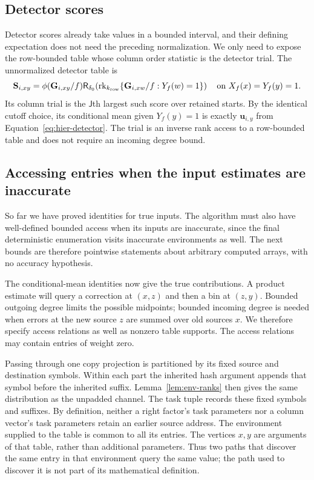 \documentclass[11pt]{article}
\numberwithin{equation}{section}
\theoremstyle{definition}
\theoremstyle{remark}
\begin{document}
\subsection{Detector scores}

Detector scores already take values in a bounded interval, and their defining expectation does not need the preceding normalization. We only need to expose the row-bounded table whose column order statistic is the detector trial. The unnormalized detector table is
\begin{equation}
 {\mathbf{S}}_{i,xy}=\phi({\mathbf{G}}_{i,xy}/f)
 {\mathsf{R}}_{\delta_0}\!\left(\operatorname{rk}_{k_{\rm row}}
       \{{\mathbf{G}}_{i,xw}/f:Y_f(w)=1\}\right)
 \quad\text{on }X_f(x)=Y_f(y)=1.
 \label{eq:atom-detector-table}
\end{equation}
Its column trial is the ${\mathsf{J}}$th largest such score over retained starts.
By the identical cutoff choice, its conditional mean given $Y_f(y)=1$
is exactly ${\mathbf{u}}_{i,y}$ from Equation~\eqref{eq:hier-detector}.
The trial is an inverse rank access to a row-bounded table and does not
require an incoming degree bound.

\subsection{Accessing entries when the input estimates are inaccurate}

So far we have proved identities for true inputs. The algorithm must also have well-defined bounded access when its inputs are inaccurate, since the final deterministic enumeration visits inaccurate environments as well. The next bounds are therefore pointwise statements about arbitrary computed arrays, with no accuracy hypothesis.

The conditional-mean identities now give the true contributions.  A
product estimate will query a correction at $(x,z)$ and then a bin at
$(z,y)$.  Bounded outgoing degree limits the possible midpoints; bounded
incoming degree is needed when errors at the new source $z$ are summed
over old sources $x$.  We therefore specify access relations as well as
nonzero table supports.  The access relations may contain entries of
weight zero.

Passing through one copy projection is partitioned by its fixed source and
destination symbols.  Within each part the inherited hash argument
appends that symbol before the inherited suffix.  Lemma~\ref{lem:env-ranks}
then gives the same distribution as the unpadded channel.  The task tuple
records these fixed symbols and suffixes.  By definition, neither a right
factor's task parameters nor a column vector's task parameters retain an
earlier source address.
The environment supplied to the table is common to all its entries.
The vertices $x,y$ are arguments of that table, rather than additional
parameters.  Thus two paths that discover the same entry in that
environment query the same value; the path used to discover it is not
part of its mathematical definition.
\end{document}
